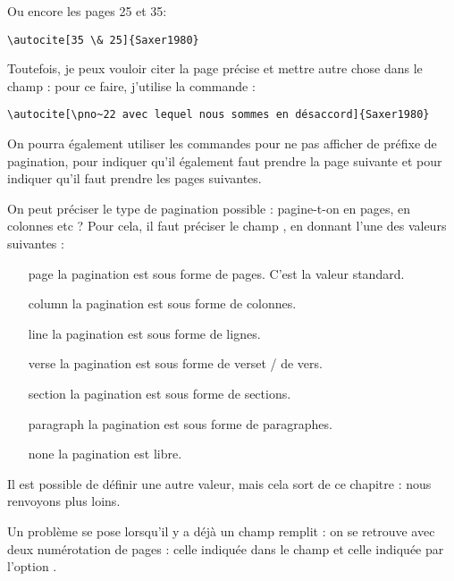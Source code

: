 Ou encore les pages 25 et 35:

\begin{verbatim}
\autocite[35 \& 25]{Saxer1980}
\end{verbatim}

Toutefois, je peux vouloir citer la page précise et mettre autre chose dans le champ  : pour ce faire, j'utilise la commande  :

\begin{verbatim}
\autocite[\pno~22 avec lequel nous sommes en désaccord]{Saxer1980}
\end{verbatim}

\begin{quotation}
	\parencite[\pno~22 avec lequel nous sommes en désaccord]{Saxer1980}
\end{quotation}
On pourra également utiliser les commandes  pour ne pas afficher de préfixe de pagination,   pour indiquer qu'il également faut prendre la page suivante et  pour indiquer qu'il faut prendre les pages suivantes.

On peut préciser le type de pagination possible : pagine-t-on en pages, en colonnes etc ? Pour cela, il faut préciser le champ , en donnant l'une des valeurs suivantes : 

\begin{enumerate}
\item[page]la pagination est sous forme de pages. C'est la valeur standard.
\item[column]la pagination est sous forme de colonnes.
\item[line]la pagination est sous forme de lignes.
\item[verse]la pagination est sous forme de verset / de vers. 
\item[section]la pagination est sous forme de sections.
\item[paragraph]la pagination est sous forme de paragraphes.
\item[none]la pagination est libre.
\end{enumerate}

\begin{anedocte}
Il est possible de définir une autre valeur, mais cela sort de ce chapitre : nous renvoyons plus loins. 

\end{anedocte}

Un problème se pose lorsqu'il y a déjà un champ  remplit : on se retrouve avec deux numérotation de pages : celle indiquée dans le champ  et celle indiquée par l'option .


